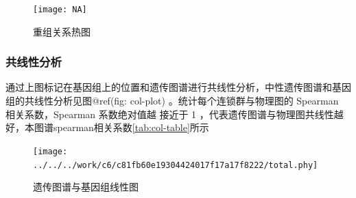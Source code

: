 \documentclass[
  a4paper,
  titlepage]{article}
\begin{document}
\begin{figure}[H]

{\centering \texttt{[image: NA]} 

}

\caption{重组关系热图}\label{fig:heatmap-plot}
\end{figure}

\hypertarget{ux5171ux7ebfux6027ux5206ux6790}{%
\subsubsection{共线性分析}\label{ux5171ux7ebfux6027ux5206ux6790}}

通过上图标记在基因组上的位置和遗传图谱进行共线性分析，中性遗传图谱和基因组的共线性分析见图@ref(fig: col-plot) 。统计每个连锁群与物理图的 Spearman 相关系数，Spearman 系数绝对值越 接近于 1 ，代表遗传图谱与物理图共线性越好，本图谱spearman相关系数\ref{tab:col-table}所示

\begin{figure}[H]

{\centering \texttt{[image: ../../../work/c6/c81fb60e19304424017f17a17f8222/total.phy]} 

}

\caption{遗传图谱与基因组线性图}\label{fig:col-plot}
\end{figure}
\end{document}
